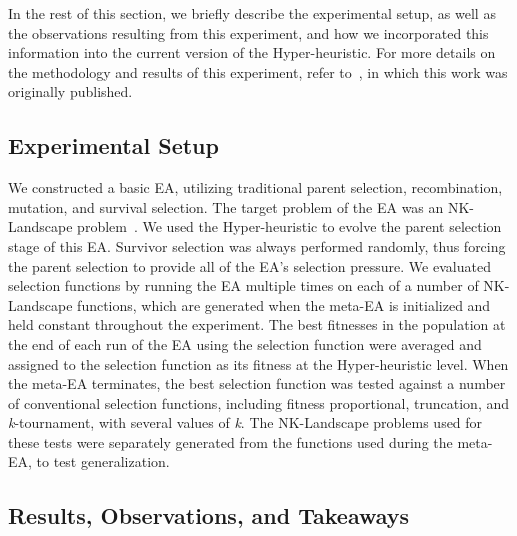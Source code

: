 \documentclass[sigconf]{acmart}
\begin{document}
In the rest of this section, we briefly describe the experimental setup, as well as the observations resulting from this experiment, and how we incorporated this information into the current version of the Hyper-heuristic. For more details on the methodology and results of this experiment, refer to~\citep{richter2018adpsea}, in which this work was originally published.

\subsection{Experimental Setup}
\label{Experimental Setup-Original}

We constructed a basic EA, utilizing traditional parent selection, recombination, mutation, and survival selection. The target problem of the EA was an NK-Landscape problem~\citep{whitley2016gray,kaufmann1993origins}. We used the Hyper-heuristic to evolve the parent selection stage of this EA. Survivor selection was always performed randomly, thus forcing the parent selection to provide all of the EA's selection pressure. We evaluated selection functions by running the EA multiple times on each of a number of NK-Landscape functions, which are generated when the meta-EA is initialized and held constant throughout the experiment. The best fitnesses in the population at the end of each run of the EA using the selection function were averaged and assigned to the selection function as its fitness at the Hyper-heuristic level. When the meta-EA terminates, the best selection function was tested against a number of conventional selection functions, including fitness proportional, truncation, and \textit{k}-tournament, with several values of \textit{k}. The NK-Landscape problems used for these tests were separately generated from the functions used during the meta-EA, to test generalization.

\subsection{Results, Observations, and Takeaways}
\label{Results-Original}
\end{document}
